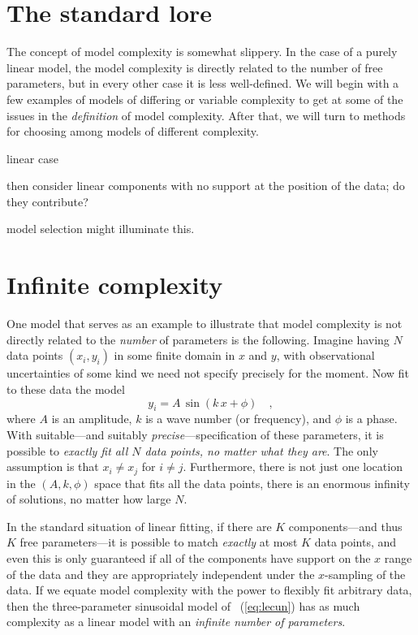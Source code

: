 \documentclass[12pt,twoside]{article}
\begin{document}
\section{The standard lore}

The concept of model complexity is somewhat slippery.  In the case of
a purely linear model, the model complexity is directly related to the
number of free parameters, but in every other case it is less
well-defined.  We will begin with a few examples of models of
differing or variable complexity to get at some of the issues in the
\emph{definition} of model complexity.  After that, we will turn to
methods for choosing among models of different complexity.

linear case

then consider linear components with no support at the position of the
data; do they contribute?

model selection might illuminate this.

\section{Infinite complexity}

One model that serves as an example to illustrate that model
complexity is not directly related to the \emph{number} of parameters
is the following.  Imagine having $N$ data points $(x_i,y_i)$ in some finite
domain in $x$ and $y$, with observational uncertainties of some kind
we need not specify precisely for the moment.  Now fit to these data
the model
\begin{equation}\label{eq:lecun}
y_i = A\,\sin (k\,x + \phi)
  \quad ,
\end{equation}
where $A$ is an amplitude, $k$ is a wave number (or frequency), and
$\phi$ is a phase.  With suitable---and suitably
\emph{precise}---specification of these parameters, it is possible to
\emph{exactly fit all $N$ data points, no matter what they are}.  The
only assumption is that $x_i \ne x_j$ for $i \ne j$.  Furthermore,
there is not just one location in the $(A,k,\phi)$ space that fits all
the data points, there is an enormous infinity of solutions, no matter
how large $N$.

In the standard situation of linear fitting, if there are $K$
components---and thus $K$ free parameters---it is possible to match
\emph{exactly} at most $K$ data points, and even this is only
guaranteed if all of the components have support on the $x$ range of
the data and they are appropriately independent under the $x$-sampling
of the data.  If we equate model complexity with the power to flexibly
fit arbitrary data, then the three-parameter sinusoidal model of
\equationname~(\ref{eq:lecun}) has as much complexity as a linear
model with an \emph{infinite number of parameters}.
\end{document}
